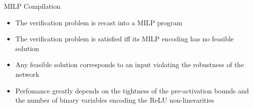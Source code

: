 \documentclass[10pt]{beamer}
\begin{document}
\begin{frame}{MILP Compilation}

\begin{itemize} \itemsep 1em
    \item The verification problem is recast into a MILP program
        \vspace{1em}
        \begin{figure}
        \end{figure}

    \item The verification problem is satisfied iff its MILP encoding has no
feasible solution

    \item Any feasible solution corresponds to an input violating the robustness of the network

    \item Perfomance greatly depends on the tightness of the pre-activation
        bounds and the  number of binary variables encoding the ReLU non-linerarities
\end{itemize}

\end{frame}

\end{document}
